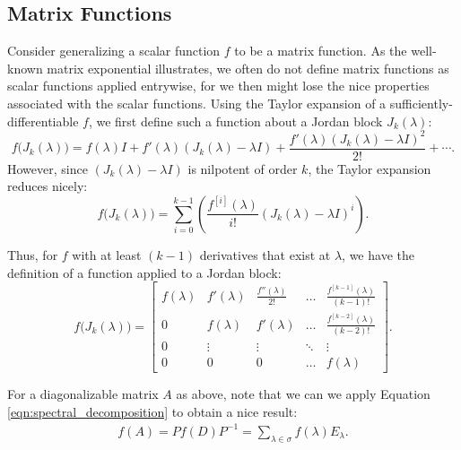 \documentclass[11pt,letterpaper]{amsart}
\newcommand{\inverse}[1]{#1^{-1}}
\newcommand{\parens}[1]{ \left( #1 \right) }
\begin{document}
\subsection{Matrix Functions}
Consider generalizing a scalar function $f$ to be a matrix function. As the
well-known matrix exponential illustrates, we often do not define matrix
functions as scalar functions applied entrywise, for we then might lose the nice
properties associated with the scalar functions. Using the Taylor expansion of a
sufficiently-differentiable $f$, we first define such a function about a Jordan
block $J_k(\lambda)$:
\begin{equation*}
  f\big( J_k(\lambda) \big)=f(\lambda)I + f'(\lambda)(J_k(\lambda) - \lambda I) + \frac{f'(\lambda)(J_k(\lambda) - \lambda I)^2}{2!} + \cdots.
\end{equation*}
However, since $(J_k(\lambda) - \lambda I)$ is nilpotent of order $k$, the
Taylor expansion reduces nicely:
\begin{equation}
  \label{eqn:f_jordan_block}
  f\big( J_k(\lambda) \big) = \sum_{i=0}^{k - 1}\parens{\frac{f^{[i]}(\lambda)}{i!} (J_k(\lambda) - \lambda I)^i}.
\end{equation}

Thus, for $f$ with at least $(k - 1)$ derivatives that exist at $\lambda$, we
have the definition of a function applied to a Jordan block:
\begin{equation}\label{eq:f_jordan_block}
  f\big( J_k(\lambda) \big) =
  \begin{bmatrix}
    f(\lambda) & f'(\lambda) & \frac{f''(\lambda)}{2!} & \ldots & \frac{f^{[k - 1]}(\lambda)}{(k-1)!} \\
    0 & f(\lambda) & f'(\lambda) & \ldots & \frac{f^{[k - 2]}(\lambda)}{(k-2)!} \\
    0 & \vdots & \vdots & \ddots & \vdots \\
    0 & 0 & 0 & \ldots & f(\lambda)
  \end{bmatrix}.
\end{equation}

For a diagonalizable matrix $A$ as above, note that we can we apply Equation
\eqref{eqn:spectral_decomposition} to obtain a nice result:
\begin{align*}
  f(A) = Pf(D)\inverse{P} = \sum_{\lambda \in \sigma}{f(\lambda) E_\lambda}.
\end{align*}
\end{document}

